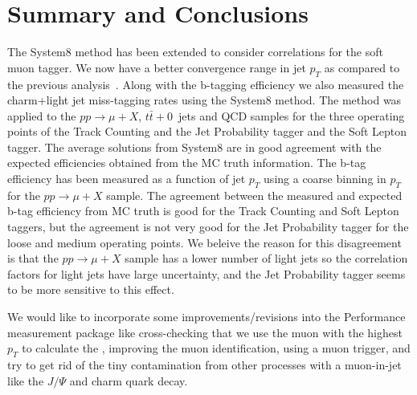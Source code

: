 \section{Summary and Conclusions}


 The System8 method has been extended to consider correlations for the soft
muon tagger. We now have a better convergence range in jet $p_T$ as compared 
to the previous analysis~\cite{ref:btag_oldnote}. Along with
the b-tagging efficiency we also measured the charm+light jet miss-tagging 
rates using the System8 method. The method was applied to the 
$pp\rightarrow \mu +X$, $t\bar{t}+0$~jets and QCD samples for the three 
operating points of the Track Counting and the Jet Probability tagger and the
Soft Lepton tagger. The average solutions from System8 are in good 
agreement with the expected efficiencies obtained from the MC truth information.
The b-tag efficiency has been measured as a function of jet $p_T$ using a coarse
binning in $p_T$ for the $pp\rightarrow \mu +X$ sample. The agreement between 
the measured and expected b-tag efficiency from MC truth is good for the Track 
Counting and Soft Lepton taggers, but the agreement is not very good for the 
Jet Probability tagger for the loose and medium operating points. We beleive
the reason for this disagreement is that the $pp\rightarrow \mu +X$ sample
 has a lower number of light jets so the correlation factors for 
light jets have large uncertainty, and the Jet Probability tagger seems to
be  more
sensitive to this effect.

 We would like to incorporate some improvements/revisions into the Performance 
measurement package like cross-checking that we use the muon with the highest 
$p_T$ to calculate the \ptrel , improving the muon identification, 
using a muon trigger, and try to get rid of the tiny contamination from other 
processes with a muon-in-jet like the $J/\Psi $ and charm quark decay.
